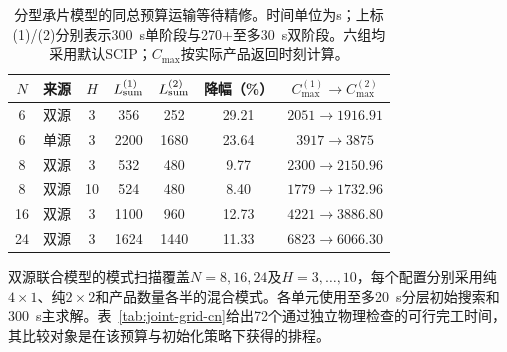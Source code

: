 \documentclass[final,5p,times,twocolumn]{elsarticle}
\begin{document}
\begin{table}[!t]
\centering\scriptsize\setlength{\tabcolsep}{2pt}
\caption{分型承片模型的同总预算运输等待精修。时间单位为s；上标(1)/(2)分别表示300~s单阶段与270+至多30~s双阶段。六组均采用默认SCIP；$C_{\max}$按实际产品返回时刻计算。}
\label{tab:joint-refinement-cn}
\begin{tabular}{ccccccc}\toprule
$N$ & 来源 & $H$ & $L_{\rm sum}^{(1)}$ & $L_{\rm sum}^{(2)}$ & 降幅（\%） & $C_{\max}^{(1)}\to C_{\max}^{(2)}$\\\midrule
6 & 双源 & 3 & 356 & 252 & 29.21 & $2051\to1916.91$\\
6 & 单源 & 3 & 2200 & 1680 & 23.64 & $3917\to3875$\\
8 & 双源 & 3 & 532 & 480 & 9.77 & $2300\to2150.96$\\
8 & 双源 & 10 & 524 & 480 & 8.40 & $1779\to1732.96$\\
16 & 双源 & 3 & 1100 & 960 & 12.73 & $4221\to3886.80$\\
24 & 双源 & 3 & 1624 & 1440 & 11.33 & $6823\to6066.30$\\
\bottomrule\end{tabular}\end{table}



双源联合模型的模式扫描覆盖$N=8,16,24$及$H=3,\ldots,10$，每个配置分别采用纯$4\times1$、纯$2\times2$和产品数量各半的混合模式。各单元使用至多20~s分层初始搜索和300~s主求解。表~\ref{tab:joint-grid-cn}给出72个通过独立物理检查的可行完工时间，其比较对象是在该预算与初始化策略下获得的排程。
\end{document}
